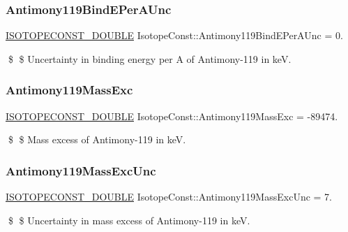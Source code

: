\subsubsection{\texorpdfstring{Antimony119\+Bind\+E\+Per\+A\+Unc}{Antimony119BindEPerAUnc}}
{\footnotesize\ttfamily \mbox{\hyperlink{group___isotope_const-_macros_ga8f45a7272ce02c0b4c65c44636ed719a}{I\+S\+O\+T\+O\+P\+E\+C\+O\+N\+S\+T\+\_\+\+D\+O\+U\+B\+LE}} Isotope\+Const\+::\+Antimony119\+Bind\+E\+Per\+A\+Unc = 0.}

\$ \$ Uncertainty in binding energy per A of Antimony-\/119 in keV. \mbox{\label{group___isotope_const-_antimony-_sb119_gaf94433c8409b534d6dd6d21797ea0f6f}} 
\subsubsection{\texorpdfstring{Antimony119\+Mass\+Exc}{Antimony119MassExc}}
{\footnotesize\ttfamily \mbox{\hyperlink{group___isotope_const-_macros_ga8f45a7272ce02c0b4c65c44636ed719a}{I\+S\+O\+T\+O\+P\+E\+C\+O\+N\+S\+T\+\_\+\+D\+O\+U\+B\+LE}} Isotope\+Const\+::\+Antimony119\+Mass\+Exc = -\/89474.}

\$ \$ Mass excess of Antimony-\/119 in keV. \mbox{\label{group___isotope_const-_antimony-_sb119_gad0df39565d722617c15c2f0d34ace034}} 
\subsubsection{\texorpdfstring{Antimony119\+Mass\+Exc\+Unc}{Antimony119MassExcUnc}}
{\footnotesize\ttfamily \mbox{\hyperlink{group___isotope_const-_macros_ga8f45a7272ce02c0b4c65c44636ed719a}{I\+S\+O\+T\+O\+P\+E\+C\+O\+N\+S\+T\+\_\+\+D\+O\+U\+B\+LE}} Isotope\+Const\+::\+Antimony119\+Mass\+Exc\+Unc = 7.}

\$ \$ Uncertainty in mass excess of Antimony-\/119 in keV. \mbox{\label{group___isotope_const-_antimony-_sb119_ga0e49c8d6e1aa88d6f35e41525424a849}} 
